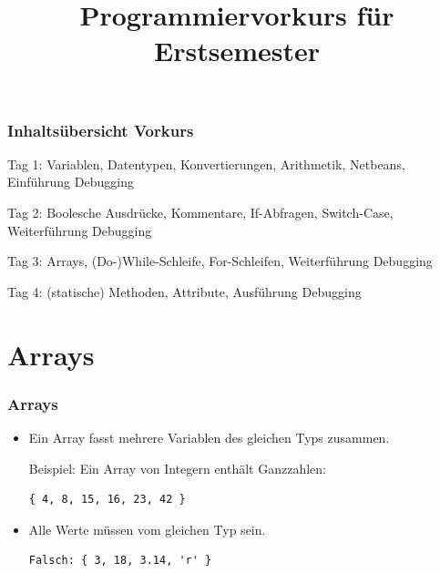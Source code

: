 \documentclass[final]{beamer}
\title{Programmiervorkurs für Erstsemester}
\begin{document}
\lstset{tabsize=4}
\lstset{basicstyle=\small}
\lstset{language=java}

\begin{frame}
	\titlepage
\end{frame}

\begin{frame}
	\frametitle{Inhaltsübersicht Vorkurs}
	\begin{itemize}
	{\color{gray}
		\item {Tag 1: Variablen, Datentypen, Konvertierungen, Arithmetik, Netbeans, Einführung Debugging}
		\item {Tag 2: Boolesche Ausdrücke, Kommentare, If-Abfragen, Switch-Case, Weiterführung Debugging}
		{\color{black}
		\item {Tag 3: Arrays, (Do-)While-Schleife, For-Schleifen, Weiterführung Debugging}
		}
		\item {Tag 4: (statische) Methoden, Attribute, Ausführung Debugging}
	}
	\end{itemize}
\end{frame}

\section{Arrays}
\begin{frame}[containsverbatim]
	\frametitle{Arrays}
	\begin{itemize}
	\item{Ein Array fasst mehrere Variablen des gleichen Typs zusammen.

	Beispiel: Ein Array von Integern enthält Ganzzahlen:}
		\begin{lstlisting}
{ 4, 8, 15, 16, 23, 42 } 
		\end{lstlisting}
	\item{Alle Werte müssen vom gleichen Typ sein.}
		\begin{lstlisting}
Falsch: { 3, 18, 3.14, 'r' }
		\end{lstlisting}
	\end{itemize}
\end{frame}
\end{document}
